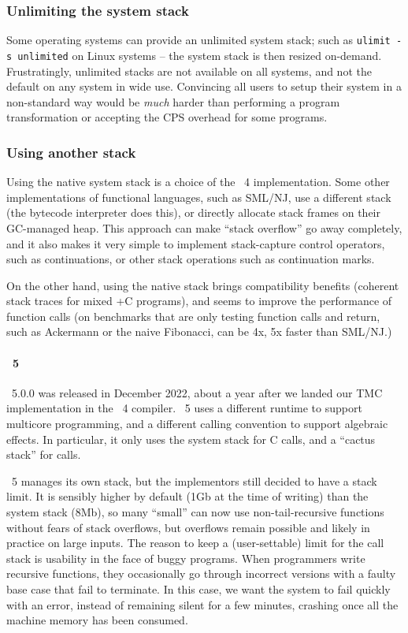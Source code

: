 \subsubsection{Unlimiting the system stack}

Some operating systems can provide an unlimited system stack; such as \texttt{ulimit -s unlimited} on Linux systems -- the system stack is then resized on-demand.
Frustratingly, unlimited stacks are not available on all systems, and not the default on any system in wide use.
Convincing all users to setup their system in a non-standard way would be \emph{much} harder than performing a program transformation or accepting the CPS overhead for some programs.

\subsubsection{Using another stack}

Using the native system stack is a choice of the \OCaml~4 implementation.
Some other implementations of functional languages, such as SML/NJ, use a different stack (the \OCaml bytecode interpreter does this), or directly allocate stack frames on their GC-managed heap.
This approach can make ``stack overflow'' go away completely, and it also makes it very simple to implement stack-capture control operators, such as continuations, or other stack operations such as continuation marks.

On the other hand, using the native stack brings compatibility benefits (coherent stack traces for mixed \OCaml+C programs), and seems to improve the performance of function calls (on benchmarks that are only testing function calls and return, such as Ackermann or the naive Fibonacci, \OCaml can be 4x, 5x faster than SML/NJ.)

\paragraph{\OCaml~5}

\OCaml~5.0.0 was released in December 2022, about a year after we landed our TMC implementation in the \OCaml~4 compiler.
\OCaml~5 uses a different runtime to support multicore programming, and a different calling convention to support algebraic effects.
In particular, it only uses the system stack for C calls, and a ``cactus stack'' for \OCaml calls.

\OCaml~5 manages its own stack, but the implementors still decided to have a stack limit.
It is sensibly higher by default (1Gb at the time of writing) than the system stack (8Mb), so many ``small'' can now use non-tail-recursive functions without fears of stack overflows, but overflows remain possible and likely in practice on large inputs.
The reason to keep a (user-settable) limit for the \OCaml call stack is usability in the face of buggy programs.
When programmers write recursive functions, they occasionally go through incorrect versions with a faulty base case that fail to terminate.
In this case, we want the system to fail quickly with an error, instead of remaining silent for a few minutes, crashing once all the machine memory has been consumed.

